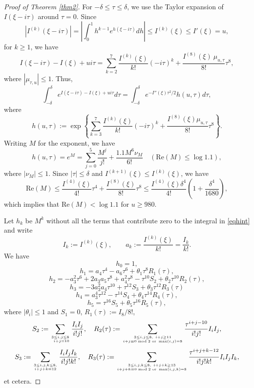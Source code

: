 \documentclass[11pt]{amsart}
\begin{document}
\begin{proof}[Proof of Theorem \ref{thm2}]
For $-\delta \le \tau \le \delta$, we use the Taylor expansion of $I(\xi-i\tau)$ around $\tau=0$. Since
$$
|I^{(k)}(\xi-i\tau)|=|\int_0^1 h^{k-1} e^{h(\xi-i\tau)} dh | \le I^{(k)}(\xi) \le I'(\xi) = u,
$$
for $k\ge 1$, we have
$$
I(\xi-i\tau)-I(\xi)+ui\tau = \sum_{k=2}^7 \frac{I^{(k)}(\xi)}{k!}(-i\tau)^k + \frac{I^{(8)} (\xi)\ \mu_{u,\tau}}{8!} \tau^8,
$$
where $|\mu_{\tau,u}|\le 1$. 
Thus,
\begin{equation}\label{eqhint}
\int_{-\delta}^{\delta} e^{I(\xi-i\tau)-I(\xi)+ui\tau }d\tau = \int_{-\delta}^\delta e^{-I''(\xi)\tau^2/2}h(u,\tau)d\tau, 
\end{equation}
where 
$$
h(u,\tau):= \exp\left\{ \sum_{k=3}^7 \frac{I^{(k)}(\xi)}{k!}(-i\tau)^k + \frac{I^{(8)} (\xi)\mu_{u,\tau}}{8!} \tau^8\right\}.
$$
Writing $M$ for the exponent, we have
$$
h(u,\tau)=e^M=\sum_{j=0}^5 \frac{M^j}{j!}+\frac{1.1 M^6 \nu_M}{6!} \quad (\mathrm{Re}( M)  \le \log 1.1),
$$
where $|\nu_M|\le 1$. 
Since $|\tau|\le \delta $ and $I^{(k+1)}(\xi)\le I^{(k)}(\xi)$, we have
\begin{equation*}\label{MUB}
\mathrm{Re}( M) \le  \frac{I^{(4)} (\xi)}{4!}\tau^4 +\frac{I^{(8)} (\xi)}{8!}\tau^8  
 \le \frac{I^{(4)} (\xi) \delta^4}{4!}\left(1+\frac{\delta^4}{1680}\right),
\end{equation*}
which implies that $\mathrm{Re}( M)<\log 1.1$ for $u\ge 980$.

Let $h_k$ be $M^k$ without all the terms that contribute zero to the integral in \eqref{eqhint} and write
$$
I_k:=I^{(k)}(\xi), \qquad a_k:= \frac{I^{(k)}(\xi)}{k!}=\frac{I_k}{k!}.
$$
We have
$$h_0=1,$$ 
$$
h_1=a_4 \tau^4 - a_6  \tau^6 +   \theta_1 \tau^8 R_1(\tau),
$$
$$
h_2= -a_3^2 \tau^6 +2a_3a_5\tau^8 +a_4^2 \tau^8
- \tau^{10} S_2
+\theta_2  \tau^{10} R_2(\tau),
$$
$$
h_3=-3a_3^2 a_4\tau^{10} +     \tau^{12} S_3 +  \theta_3   \tau^{12} R_3(\tau)
$$
$$
h_4=a_3^4 \tau^{12} - \tau^{14} S_4 + \theta_4  \tau^{14} R_4(\tau),
$$
$$
h_5 =\tau^{16} S_5 + \theta_5 \tau^{16} R_5(\tau),
$$
where $|\theta_i|\le 1$ and $S_1=0$, $R_1(\tau):=I_8/8!$, 
$$
S_2:= \sum_{3\le i,j\le 8\atop \ i+j = 10 }\frac{I_i I_j}{i!j!},\quad
R_2(\tau):= \sum_{3\le i,j\le 8, \ i+j \ge 11 \atop  i+j \equiv 0 \bmod 2 \text{ or } \max(i,j)=8}\frac{\tau^{i+j-10}}{i!j!}I_i I_j,
$$
$$
S_3:=\sum_{3\le i,j,k\le 8, \atop  i+j+k = 12  }\frac{I_i I_j I_k}{i!j!k!} , \quad
R_3(\tau):=\sum_{3\le i,j,k\le 8, \ i+j+k \ge 13 \atop  i+j +k\equiv 0 \bmod 2 \text{ or } \max(i,j,k)=8}\frac{\tau^{i+j+k-12}}{i!j!k!} I_i I_j I_k,
$$
et cetera.


\end{proof}
\end{document}
